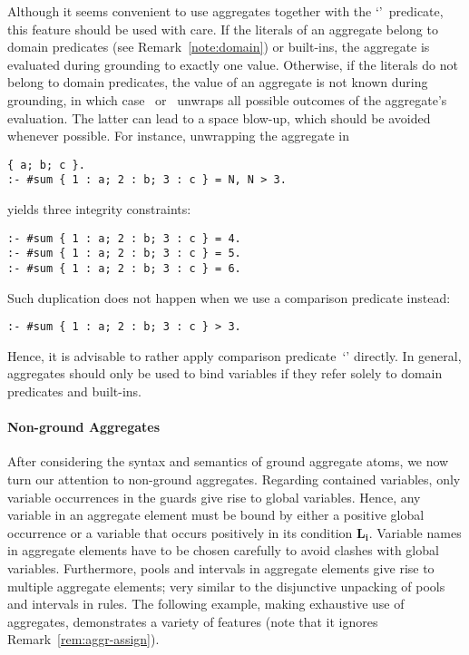 \begin{note}\label{rem:aggr-assign}
Although it seems convenient to use aggregates together with the `\code{=}'~predicate,
this feature should be used with care.
If the literals of an aggregate belong to domain predicates (see Remark~\ref{note:domain}) or built-ins,
the aggregate is evaluated during grounding to exactly one value.
Otherwise, if the literals do not belong to domain predicates,
the value of an aggregate is not known during grounding,
in which case \gringo\ or \clingo\ unwraps all possible outcomes of the
aggregate's evaluation.
The latter can lead to a space blow-up,
which should be avoided whenever possible.
For instance, unwrapping the aggregate in
\begin{lstlisting}[numbers=none]
{ a; b; c }.
:- #sum { 1 : a; 2 : b; 3 : c } = N, N > 3.
\end{lstlisting}
yields three integrity constraints:
\begin{lstlisting}[numbers=none]
:- #sum { 1 : a; 2 : b; 3 : c } = 4.
:- #sum { 1 : a; 2 : b; 3 : c } = 5.
:- #sum { 1 : a; 2 : b; 3 : c } = 6.
\end{lstlisting}
Such duplication does not happen
when we use a comparison predicate instead:
\begin{lstlisting}[numbers=none]
:- #sum { 1 : a; 2 : b; 3 : c } > 3.
\end{lstlisting}
Hence, it is advisable to rather apply comparison predicate~`\code{>}' directly.
In general, aggregates should only be used to bind variables
if they refer solely to domain predicates and built-ins.
\end{note}

\paragraph{Non-ground Aggregates}

After considering the syntax and semantics of ground aggregate atoms,
we now turn our attention to non-ground aggregates.
Regarding contained variables,
only variable occurrences in the guards give rise to global variables.
Hence, any variable in an aggregate element must be bound by either a positive global occurrence or a variable
that occurs positively in its condition $\boldsymbol{L_i}$.
Variable names in aggregate elements have to be chosen carefully to avoid clashes with global variables.
Furthermore, pools and intervals in aggregate elements give rise to multiple aggregate elements;
very similar to the disjunctive unpacking of pools and intervals in rules.
The following example, making exhaustive use of aggregates,
demonstrates a variety of features
(note that it ignores Remark~\ref{rem:aggr-assign}).

